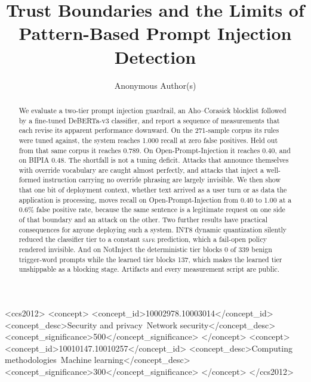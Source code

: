 \documentclass[sigconf,anonymous,review]{acmart}
\begin{document}
\title{Trust Boundaries and the Limits of Pattern-Based Prompt Injection
Detection}

\author{Anonymous Author(s)}

\begin{abstract}
We evaluate a two-tier prompt injection guardrail, an Aho--Corasick blocklist
followed by a fine-tuned DeBERTa-v3 classifier, and report a sequence of
measurements that each revise its apparent performance downward. On the
271-sample corpus its rules were tuned against, the system reaches 1.000 recall
at zero false positives. Held out from that same corpus it reaches 0.789. On
Open-Prompt-Injection it reaches 0.40, and on BIPIA 0.48. The shortfall is not a
tuning deficit. Attacks that announce themselves with override vocabulary are
caught almost perfectly, and attacks that inject a well-formed instruction
carrying no override phrasing are largely invisible. We then show that one bit of
deployment context, whether text arrived as a user turn or as data the
application is processing, moves recall on Open-Prompt-Injection from 0.40 to
1.00 at a 0.6\% false positive rate, because the same sentence is a legitimate
request on one side of that boundary and an attack on the other. Two further
results have practical consequences for anyone deploying such a system. INT8
dynamic quantization silently reduced the classifier tier to a constant
\textsc{safe} prediction, which a fail-open policy rendered invisible. And on
NotInject the deterministic tier blocks 0 of 339 benign trigger-word prompts
while the learned tier blocks 137, which makes the learned tier unshippable as a
blocking stage. Artifacts and every measurement script are public.
\end{abstract}

\begin{CCSXML}
<ccs2012>
<concept>
<concept_id>10002978.10003014</concept_id>
<concept_desc>Security and privacy~Network security</concept_desc>
<concept_significance>500</concept_significance>
</concept>
<concept>
<concept_id>10010147.10010257</concept_id>
<concept_desc>Computing methodologies~Machine learning</concept_desc>
<concept_significance>300</concept_significance>
</concept>
</ccs2012>
\end{CCSXML}
\end{document}
